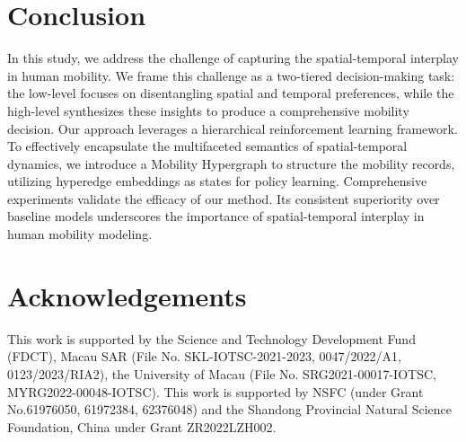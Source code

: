 \documentclass[letterpaper]{article} %
\begin{document}
\section{Conclusion}
In this study, we address the challenge of capturing the spatial-temporal interplay in human mobility.
We frame this challenge as a two-tiered decision-making task: the low-level focuses on disentangling spatial and temporal preferences, while the high-level synthesizes these insights to produce a comprehensive mobility decision.
Our approach leverages a hierarchical reinforcement learning framework.
To effectively encapsulate the multifaceted semantics of spatial-temporal dynamics, we introduce a Mobility Hypergraph to structure the mobility records, utilizing hyperedge embeddings as states for policy learning.
Comprehensive experiments validate the efficacy of our method.
Its consistent superiority over baseline models underscores the importance of spatial-temporal interplay in human mobility modeling.

\section{Acknowledgements}
This work is supported by the Science and Technology Development Fund (FDCT), Macau SAR (File No. SKL-IOTSC-2021-2023, 0047/2022/A1, 0123/2023/RIA2), the University of Macau (File No. SRG2021-00017-IOTSC, MYRG2022-00048-IOTSC).
This work is supported by NSFC (under Grant No.61976050, 61972384, 62376048) and the Shandong Provincial Natural Science Foundation, China under Grant ZR2022LZH002.

\clearpage

\end{document}
